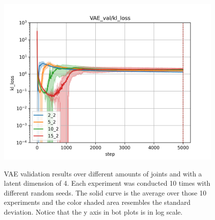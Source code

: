 \begin{figure}
\begin{center}
{        \includegraphics[width=0.31 \linewidth]{figures/experiments/vae_comparison_latent_2_kl_loss.png}
            \label{fig:VAE_latent/kl_2}
            }
        \hfill
        \hfill
    \end{center}
    \caption[VAE validation results, only distance loss and latent = 4]{VAE validation results over different amounts of joints and with a latent dimension of 4. Each experiment was conducted 10 times with different random seeds. The solid curve is the average over those 10 experiments and the color shaded area resembles the standard deviation. Notice that the y axis in bot plots is in log scale.}
    \label{fig:VAE_latent}
\end{figure}

